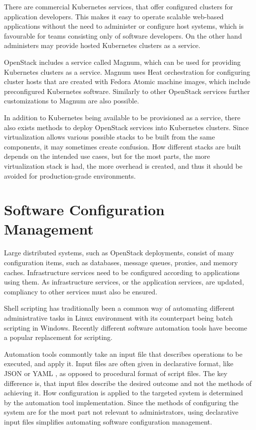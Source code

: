 \documentclass[officiallayout]{tktla}
\begin{document}
There are commercial Kubernetes services, that offer configured clusters for
application developers. This makes it easy to operate scalable web-based
applications without the need to administer or configure host systems, which is
favourable for teams consisting only of software developers. On the other hand
administers may provide hosted Kubernetes clusters as a service.

OpenStack includes a service called Magnum, which can be used for providing
Kubernetes clusters as a service. Magnum uses Heat orchestration for
configuring cluster hosts that are created with Fedora Atomic machine images,
which include preconfigured Kubernetes software. Similarly to other OpenStack
services further customizations to Magnum are also possible.

In addition to Kubernetes being available to be provisioned as a service, there
also exists methods to deploy OpenStack services into Kubernetes clusters.
Since virtualization allows various possible stacks to be built from the same
components, it may sometimes create confusion. How different stacks are built
depends on the intended use cases, but for the most parts, the more
virtualization stack is had, the more overhead is created, and thus it should
be avoided for production-grade environments.

\section{Software Configuration Management}

Large distributed systems, such as OpenStack deployments, consist of many
configuration items, such as databases, message queues, proxies, and memory
caches. Infrastructure services need to be configured according to applications
using them. As infrastructure services, or the application services, are
updated, compliancy to other services must also be ensured.

Shell scripting has traditionally been a common way of automating different
administrative tasks in Linux environment with its counterpart being batch
scripting in Windows. Recently different software automation tools have become
a popular replacement for scripting.

Automation tools commontly take an input file that describes operations to be
executed, and apply it. Input files are often given in declarative format, like
JSON \cite{json} or YAML \cite{yaml}, as opposed to procedural format of script
files. The key difference is, that input files describe the desired outcome and
not the methods of achieving it. How configuration is applied to the targeted
system is determined by the automation tool implementation. Since the methods
of configuring the system are for the most part not relevant to administrators,
using declarative input files simplifies automating software configuration
management.
\end{document}
